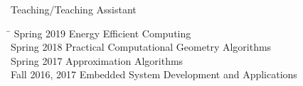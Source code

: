
\begin{rSection}{Teaching/Teaching Assistant}
\begin{tabbing}
\hspace{1.0in}\= \kill
    Spring 2019 \> Energy Efficient Computing \\
    Spring 2018 \> Practical Computational Geometry Algorithms \\
    Spring 2017 \> Approximation Algorithms \\
    Fall 2016, 2017 \>  Embedded System Development and Applications
\end{tabbing}
\end{rSection}

